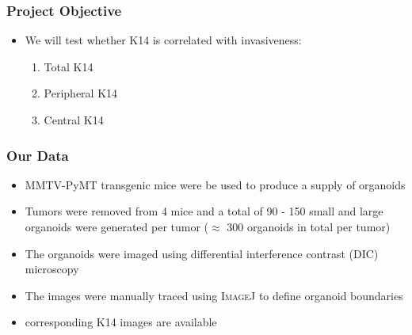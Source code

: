 \documentclass{beamer} %
\begin{document}
\begin{frame}
	\frametitle{Project Objective}
	\begin{itemize}
		\item We will test whether K14 is correlated with invasiveness:
		\begin{enumerate}
			\item Total K14 
			\item Peripheral K14
			\item Central K14
		\end{enumerate}
	\end{itemize}
\end{frame}


\begin{frame}
	\frametitle{Our Data}
	\begin{itemize}
			\item MMTV-PyMT transgenic mice were be used to produce a supply of organoids
			\item Tumors were removed from 4 mice and a total of 90 - 150 small and large organoids were generated per tumor ($\approx$ 300 organoids in total per tumor)
			\item The organoids were imaged using differential interference contrast (DIC) microscopy
			\item The images were manually traced using \textsc{ImageJ} to define organoid boundaries
			\item corresponding K14 images are available
	\end{itemize}
\end{frame}

\end{document}
